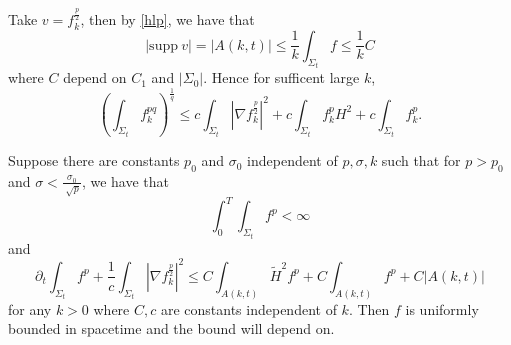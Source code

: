 Take $v=f_{k}^{\frac{p}{2}} $, then by \autoref{hlp}, we have that 
\[\left| \mathrm{supp}  \  v \right|=\left| A(k,t) \right| \leq \frac{1}{k} \int_{\Sigma_t} f \leq \frac{1}{k} C  \]
where $C$ depend on $C_1$ and $\left| \Sigma_0 \right| $. Hence for sufficent large $k$,
\begin{equation} \label{MSF}
    \left(\int_{\Sigma_t} f_{k}^{pq} \right) ^{\frac{1}{q}} \leq c \int_{\Sigma_t} \left| \nabla f_{k}^{\frac{p}{2}} \right| ^2 + c \int_{\Sigma_t} f_{k}^{p} H^2 + c \int_{\Sigma_t} f_{k}^{p}.
\end{equation}

\begin{theorem}
    Suppose there are constants $p_0$ and $\sigma _0$ independent of $p, \sigma , k$ such that for $p>p_0$ and $\sigma < \frac{\sigma _0}{\sqrt[]{p}}$, we have that 
    \[\int_{0}^{T}\int_{\Sigma_t} f^p < \infty \]
    and
    \begin{equation} \label{ELEFP}
        \partial _t \int_{\Sigma_t} f^p + \frac{1}{c} \int_{\Sigma_t} \left| \nabla f_{k}^{\frac{p}{2}}  \right| ^2 \leq C \int_{A(k,t)}^{} \tilde{H}^2 f^p +C \int_{A(k,t)}^{}f^p + C \left| A(k,t) \right| 
    \end{equation}
    for any $k>0$ where $C,c$ are constants independent of $k$.
    Then $f$ is uniformly bounded in spacetime and the bound will depend on.
\end{theorem}

